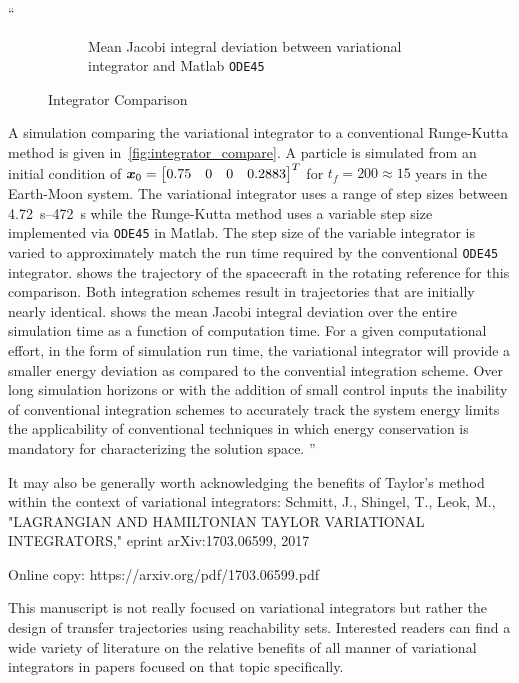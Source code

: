\documentclass[11pt]{article}
\newenvironment{correction}{\begin{list}{}{\setlength{\leftmargin}{1cm}\setlength{\rightmargin}{1cm}}\vspace{\parsep}\item[]``}{''\end{list}}
\begin{document}
\begin{enumerate}
\begin{correction}
\begin{figure}
\begin{subfigure}[htbp]{0.5\textwidth}
                \caption{Mean Jacobi integral deviation between variational integrator and Matlab \texttt{ODE45}} 
        \end{subfigure} 
        \caption{Integrator Comparison}
\end{figure}
A simulation comparing the variational integrator to a conventional Runge-Kutta method is given in~\cref{fig:integrator_compare}.
A particle is simulated from an initial condition of \( \bm{x}_0 = \begin{bmatrix} 0.75 & 0 & 0 & 0.2883\end{bmatrix}^T \) for \( t_f = 200 \approx 15\) years in the Earth-Moon system.
    The variational integrator uses a range of step sizes between \SIrange{4.72}{472}{\second} while the Runge-Kutta method uses a variable step size implemented via \texttt{ODE45} in Matlab.
    The step size of the variable integrator is varied to approximately match the run time required by the conventional \texttt{ODE45} integrator.
 shows the trajectory of the spacecraft in the rotating reference for this comparison.
Both integration schemes result in trajectories that are initially nearly identical.
 shows the mean Jacobi integral deviation over the entire simulation time as a function of computation time.
For a given computational effort, in the form of simulation run time, the variational integrator will provide a smaller energy deviation as compared to the convential integration scheme.
Over long simulation horizons or with the addition of small control inputs the inability of conventional integration schemes to accurately track the system energy limits the applicability of conventional techniques in which energy conservation is mandatory for characterizing the solution space.
\end{correction}
\item 
    \begin{itshape}
It may also be generally worth acknowledging the benefits of Taylor's method within the context of variational integrators:
Schmitt, J., Shingel, T., Leok, M., "LAGRANGIAN AND HAMILTONIAN TAYLOR VARIATIONAL INTEGRATORS," eprint arXiv:1703.06599, 2017

Online copy: https://arxiv.org/pdf/1703.06599.pdf 
\end{itshape}

This manuscript is not really focused on variational integrators but rather the design of transfer trajectories using reachability sets.
Interested readers can find a wide variety of literature on the relative benefits of all manner of variational integrators in papers focused on that topic specifically.


\end{enumerate}
\end{document}
